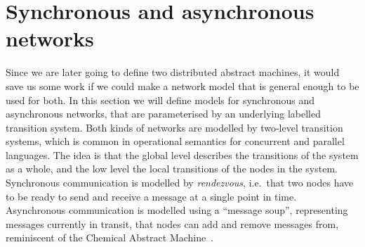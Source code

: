 \documentclass{article}
\theoremstyle{definition}
\begin{document}
\section{Synchronous and asynchronous networks} \label{section:Networks}
Since we are later going to define two distributed abstract machines, it would
save us some work if we could make a network model that is general enough to be
used for both. In this section we will define models for synchronous
and asynchronous networks, that are parameterised by an underlying labelled
transition system. Both kinds of networks are modelled by two-level transition
systems, which is common in operational semantics for concurrent and parallel
languages. The idea is that the global level describes the transitions of the
system as a whole, and the low level the local transitions of the nodes in the
system.
Synchronous communication is modelled by \emph{rendezvous}, i.e.\ that two
nodes have to be ready to send and receive a message at a single point in time.
Asynchronous communication is modelled using a ``message soup'', representing
messages currently in transit, that nodes can add and remove messages from,
reminiscent of the Chemical Abstract Machine~\cite{DBLP:conf/popl/BerryB90}.
\end{document}
